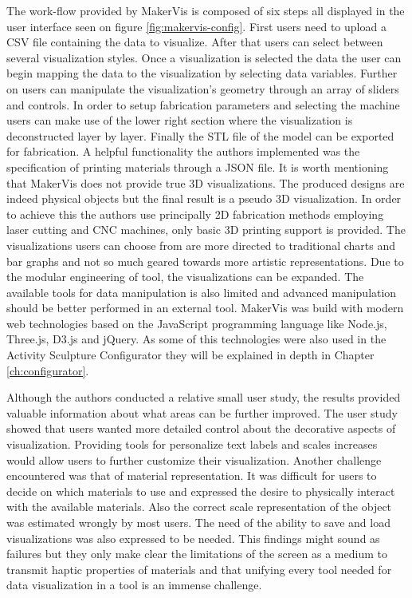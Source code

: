 \documentclass[../medieninformatik-arbeit.tex]{subfiles}
\begin{document}
The work-flow provided by MakerVis is composed of six steps all displayed in the user interface seen on figure \ref{fig:makervis-config}. First users need to upload a CSV file containing the data to visualize. After that users can select between several visualization styles. Once a visualization is selected the data the user can begin mapping the data to the visualization by selecting data variables. Further on users can manipulate the visualization's geometry through an array of sliders and controls. In order to setup fabrication parameters and selecting the machine users can make use of the lower right section where the visualization is deconstructed layer by layer. Finally the STL file of the model can be exported for fabrication. A helpful functionality the authors implemented was the specification of printing materials through a JSON file.  It is worth mentioning that MakerVis does not provide true 3D visualizations. The produced designs are indeed physical objects but the final result is a pseudo 3D visualization. In order to achieve this the authors use principally 2D fabrication methods employing laser cutting and CNC machines, only basic 3D printing support is provided. The visualizations users can choose from are more directed to traditional charts and bar graphs and not so much geared towards more artistic representations. Due to the modular engineering of tool, the visualizations can be expanded. The available tools for data manipulation is also limited and advanced manipulation should be better performed in an external tool. MakerVis was build with modern web technologies based on the JavaScript programming language like Node.js\cite{joyent2015node}, Three.js\cite{cabello2010three}, D3.js\cite{bostock2015d3js} and jQuery\cite{jqf2015jquery}. As some of this technologies were also used in the Activity Sculpture Configurator they will be explained in depth in Chapter \ref{ch:configurator}. 

Although the authors conducted a relative small user study, the results provided valuable information about what areas can be further improved. The user study showed that users wanted more detailed control about the decorative aspects of visualization. Providing tools for personalize text labels and scales increases would allow users to further customize their visualization. Another challenge encountered was that of material representation. It was difficult for users to decide on which materials to use and expressed the desire to physically interact with the available materials. Also the correct scale representation of the object was estimated wrongly by most users. The need of the ability to save and load visualizations was also expressed to be needed. This findings might sound as failures but they only make clear the limitations of the screen as a medium to transmit haptic properties of materials and that unifying every tool needed for data visualization in a tool is an immense challenge.
\end{document}

